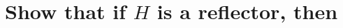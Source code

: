 \documentclass[11pt,a4paper]{article}
\begin{document}
\begin{titlepage}
    \maketitle
\end{titlepage}
%
\newcommand{\be}{\begin{eqnarray}}
\newcommand{\ee}{\end{eqnarray}}
\newcommand{\no}{\nonumber}
\newpage
\setcounter{section}{1}
\section{Show that if $H$ is a reflector, then}
\end{document}
